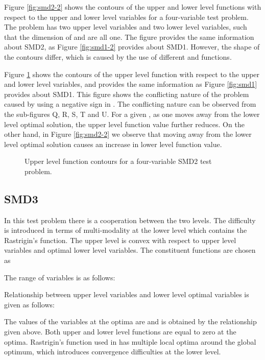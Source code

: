 \documentclass[twoside]{article}
\begin{document}
Figure \ref{fig:smd2-2} shows the contours of the upper and lower level functions with respect to the upper and lower level variables for a four-variable test problem. The problem has two upper level variables and two lower level variables, such that the dimension of  and  are all one. The figure provides the same information about SMD2, as Figure \ref{fig:smd1-2} provides about SMD1. However, the shape of the contours differ, which is caused by the use of different  and  functions.

Figure \ref{fig:smd2} shows the contours of the upper level function with respect to the upper and lower level variables, and provides the same information as Figure \ref{fig:smd1} provides about SMD1. This figure shows the conflicting nature of the problem caused by using a negative sign in . The conflicting nature can be observed from the sub-figures Q, R, S, T and U. For a given , as one moves away from the lower level optimal solution, the upper level function value further reduces. On the other hand, in Figure \ref{fig:smd2-2} we observe that moving away from the lower level optimal solution causes an increase in lower level function value.

\begin{figure}
\begin{center}
\caption{Upper level function contours for a four-variable SMD2 test problem.}
\label{fig:smd2}
\end{center}
\end{figure}

\subsection{SMD3}
In this test problem there is a cooperation between the two levels. The difficulty is introduced in terms of multi-modality at the lower level which contains the Rastrigin's function. The upper level is convex with respect to upper level variables and optimal lower level variables. The constituent functions are chosen as

The range of variables is as follows:

Relationship between upper level variables and lower level optimal variables is given as follows:

The values of the variables at the optima are  and  is obtained by the relationship given above. Both upper and lower level functions are equal to zero at the optima. Rastrigin's function used in  has multiple local optima around the global optimum, which introduces convergence difficulties at the lower level.
\end{document}
